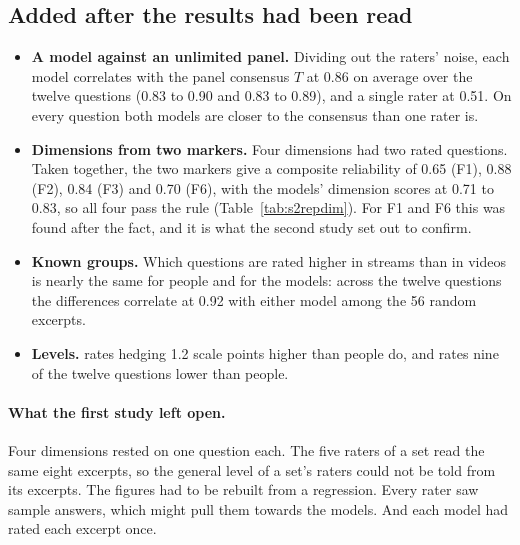 \subsection{Added after the results had been read}\label{sec:firstadded}

\begin{itemize}
\item \textbf{A model against an unlimited panel.} Dividing out the raters' noise, each model correlates with
  the panel consensus $T$ at 0.86 on average over the twelve questions (0.83 to 0.90 and 0.83 to 0.89), and a
  single rater at 0.51. On every question both models are closer to the consensus than one rater is.
\item \textbf{Dimensions from two markers.} Four dimensions had two rated questions. Taken together, the two
  markers give a composite reliability of 0.65 (F1), 0.88 (F2), 0.84 (F3) and 0.70 (F6), with the models'
  dimension scores at 0.71 to 0.83, so all four pass the rule (Table~\ref{tab:s2repdim}). For F1 and F6 this
  was found after the fact, and it is what the second study set out to confirm.
\item \textbf{Known groups.} Which questions are rated higher in streams than in videos is nearly the same for
  people and for the models: across the twelve questions the differences correlate at 0.92 with either model
  among the 56 random excerpts.
\item \textbf{Levels.} \jev{} rates hedging 1.2 scale points higher than people do, and \drex{} rates nine of the
  twelve questions lower than people.
\end{itemize}

\paragraph{What the first study left open.} Four dimensions rested on one question each. The five raters of a
set read the same eight excerpts, so the general level of a set's raters could not be told from its excerpts.
The figures had to be rebuilt from a regression. Every rater saw sample answers, which might pull them towards
the models. And each model had rated each excerpt once.
